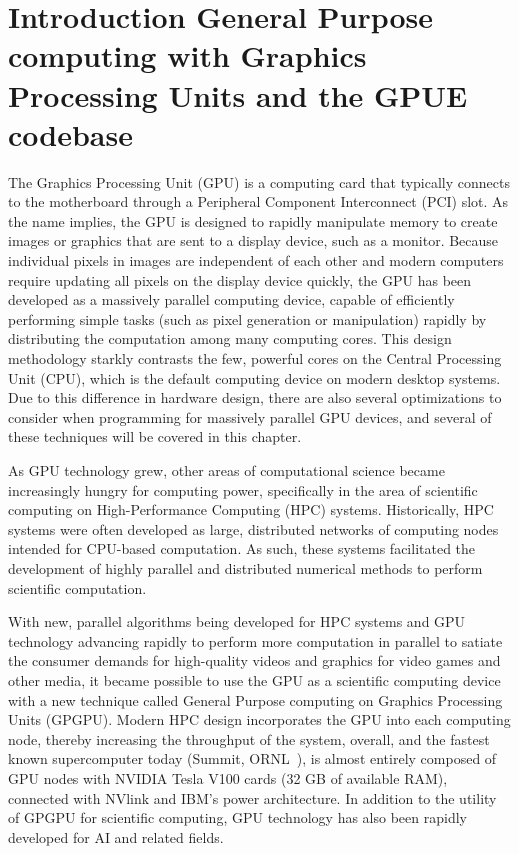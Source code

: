 \chapter{Introduction General Purpose computing with Graphics Processing Units and the GPUE codebase}
\label{ch:gpu}

The Graphics Processing Unit (GPU) is a computing card that typically connects to the motherboard through a Peripheral Component Interconnect (PCI) slot.
As the name implies, the GPU is designed to rapidly manipulate memory to create images or graphics that are sent to a display device, such as a monitor.
Because individual pixels in images are independent of each other and modern computers require updating all pixels on the display device quickly, the GPU has been developed as a massively parallel computing device, capable of efficiently performing simple tasks (such as pixel generation or manipulation) rapidly by distributing the computation among many computing cores.
This design methodology starkly contrasts the few, powerful cores on the Central Processing Unit (CPU), which is the default computing device on modern desktop systems.
Due to this difference in hardware design, there are also several optimizations to consider when programming for massively parallel GPU devices, and several of these techniques will be covered in this chapter.

As GPU technology grew, other areas of computational science became increasingly hungry for computing power, specifically in the area of scientific computing on High-Performance Computing (HPC) systems.
Historically, HPC systems were often developed as large, distributed networks of computing nodes intended for CPU-based computation.
As such, these systems facilitated the development of highly parallel and distributed numerical methods to perform scientific computation.

With new, parallel algorithms being developed for HPC systems and GPU technology advancing rapidly to perform more computation in parallel to satiate the consumer demands for high-quality videos and graphics for video games and other media, it became possible to use the GPU as a scientific computing device with a new technique called General Purpose computing on Graphics Processing Units (GPGPU).
Modern HPC design incorporates the GPU into each computing node, thereby increasing the throughput of the system, overall, and the fastest known supercomputer today (Summit, ORNL~\cite{kahle2019}), is almost entirely composed of GPU nodes with NVIDIA Tesla V100 cards (32 GB of available RAM), connected with NVlink and IBM's power architecture.
In addition to the utility of GPGPU for scientific computing, GPU technology has also been rapidly developed for AI and related fields.

